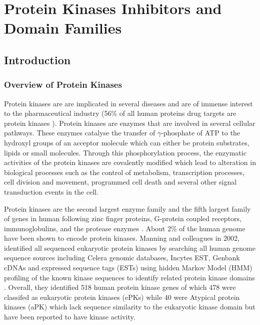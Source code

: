 \documentclass[a4paper, 11pt]{report}
\begin{document}

\setcounter{chapter}{0}
\chapter{Protein Kinases Inhibitors and Domain Families}

\section{Introduction}
\subsection{Overview of Protein Kinases}
Protein kinases are are implicated in several diseases and are of immense interest to the pharmaceutical industry (56\% of all human proteins drug targets are protein kinases \cite{santos2017comprehensive}). Protein kinases are enzymes that are involved in several cellular pathways. These enzymes catalyse the transfer of $\gamma$-phosphate of ATP to the hydroxyl groups of an acceptor molecule which can either be protein substrates, lipids or small molecules. Through this phosphorylation process, the enzymatic activities of the protein kinases are covalently modified which lead to alteration in biological processes such as the control of metabolism, transcription processes, cell division and movement, programmed cell death and several other signal transduction events in the cell. \par
Protein kinases are the second largest enzyme family and the fifth largest family of genes in human following zinc finger proteins, G-protein coupled receptors, immunoglobulins, and the protease enzymes \cite{roskoski2016classification}. About 2\% of the human genome have been shown to encode protein kinases. Manning and colleagues in 2002, identified all sequenced eukaryotic protein kinases by searching all human genome sequence sources including  Celera genomic databases, Incytes EST, Genbank cDNAs and expressed sequence tags (ESTs) using hidden Markov Model (HMM) profiling of the known kinase sequences to identify related protein kinase domains \cite{manning2002protein}. Overall, they identified 518 human protein kinase genes of which 478 were classifed as eukaryotic protein kinases (ePKs) while 40 were Atypical protein kinases (aPK) which lack sequence similarity to the eukaryotic kinase domain but have been reported to have kinase activity.\par
\end{document}
